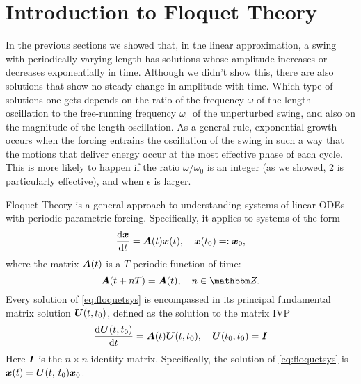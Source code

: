 \documentclass[10pt,letter, swedish, english,%
]{article}
\newcommand{\I}{{\mathbfrm{I}}}
\begin{document}





\section{Introduction to Floquet Theory}
In the previous sections we showed that, in the linear approximation, a
swing with periodically varying length has solutions whose amplitude
increases or decreases exponentially in time. Although we didn’t show
this, there are also solutions that show no steady change in amplitude
with time. Which type of solutions one gets depends on the ratio of
the frequency $\omega$ of the length oscillation to the free-running
frequency $\omega_0$ of the unperturbed swing, and also on the magnitude  of the
length oscillation. As a general rule, exponential growth occurs when
the forcing entrains the oscillation of the swing in such a way that
the motions that deliver energy occur at the most effective phase of
each cycle. This is more likely to happen if the ratio $\omega/\omega_0$ is an integer
(as we showed, 2 is particularly effective), and when $\epsilon$ is larger.  

Floquet Theory is a general approach to understanding systems of
linear ODEs with periodic parametric forcing. Specifically, it applies
to systems of the form 
\begin{equation}\label{eq:floquetsys}%
\dv{\vb{x}}{t}=\vb{A}(t)\vb{x}(t)
\qcomma \vb{x}(t_0)=:\vb{x}_0,
\end{equation}
where the matrix $\vb{A}(t)$ is a $T$-periodic function of time: 
\begin{equation}\label{eq:2}
\vb{A}(t+nT)=\vb{A}(t)\qcomma
n\in\Z.
\end{equation}
Every solution of \eqref{eq:floquetsys} is encompassed in its principal
fundamental matrix solution $\vb{U}(t,t_0)$, defined as the solution
to the matrix IVP  
\begin{equation}
\dv{\vb{U}(t,t_0)}{t}=\vb{A}(t)\vb{U}(t,t_0)\qcomma
\vb{U}(t_0,t_0)=\I
\end{equation}
Here  $\I$ is the  $n\times n$ identity matrix. Specifically, the
solution of \eqref{eq:floquetsys} is  $\vb{x}(t)=\vb{U}(t,\,{t}_{0})\vb{x}_{0}$.
\end{document}

